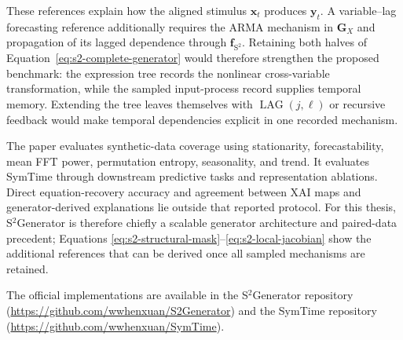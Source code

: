 These references explain how the aligned stimulus $\mathbf x_t$ produces
$\mathbf y_t$. A variable--lag forecasting reference additionally requires
the ARMA mechanism in $\mathbf G_X$ and propagation of its lagged dependence
through $\mathbf f_{\mathrm{S^2}}$. Retaining both halves of
Equation~\eqref{eq:s2-complete-generator} would therefore strengthen the
proposed benchmark: the expression tree records the nonlinear cross-variable
transformation, while the sampled input-process record supplies temporal
memory. Extending the tree leaves themselves with
$\operatorname{LAG}(j,\ell)$ or recursive feedback would make temporal
dependencies explicit in one recorded mechanism.

The paper evaluates synthetic-data coverage using stationarity,
forecastability, mean FFT power, permutation entropy, seasonality, and trend.
It evaluates SymTime through downstream predictive tasks and representation
ablations. Direct equation-recovery accuracy and agreement
between XAI maps and generator-derived explanations lie outside that reported
protocol. For this thesis, S$^2$Generator is therefore chiefly a scalable
generator architecture and paired-data precedent; Equations
\eqref{eq:s2-structural-mask}--\eqref{eq:s2-local-jacobian} show the additional
references that can be derived once all sampled mechanisms are retained.

The official implementations are available in the S$^2$Generator repository
(\url{https://github.com/wwhenxuan/S2Generator}) and the SymTime repository
(\url{https://github.com/wwhenxuan/SymTime}).

